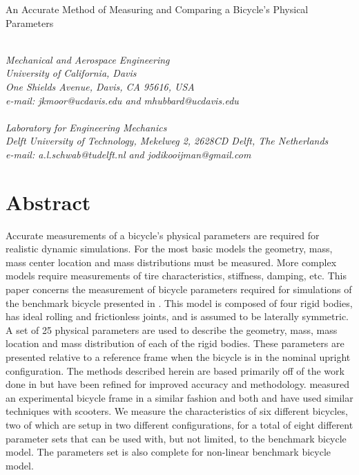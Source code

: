 \documentclass{bmd2010a}
\begin{document}
\begin{flushleft}
{\fontsize{16pt}{20pt}\selectfont%
  An Accurate Method of Measuring and Comparing a Bicycle's Physical Parameters\\}
\end{flushleft}

\begin{flushleft}
  {\\}
  \textit{Mechanical and Aerospace Engineering\\
          University of California, Davis\\
          One Shields Avenue, Davis, CA 95616, USA\\
          e-mail: jkmoor@ucdavis.edu and mhubbard@ucdavis.edu
  }\vspace{10pt}\\
  {\\}
  \textit{Laboratory for Engineering Mechanics\\
          Delft University of Technology, Mekelweg 2, 2628CD Delft, The
          Netherlands\\
          e-mail: a.l.schwab@tudelft.nl and jodikooijman@gmail.com
  }\vspace{10pt}\\
\end{flushleft}

\section*{Abstract}
Accurate measurements of a bicycle's physical parameters are required for
realistic dynamic simulations. For the most basic models the geometry, mass,
mass center location and mass distributions must be measured. More complex models
require measurements of tire characteristics, stiffness, damping, etc. This
paper concerns the measurement of bicycle parameters required for
simulations of the benchmark bicycle presented in \cite{Meijaard2007}. This
model is composed of four rigid bodies, has ideal rolling and frictionless joints,
and is assumed to be laterally symmetric. A set of 25
physical parameters are used to describe the geometry, mass, mass location and
mass distribution of each of the rigid bodies. These parameters are presented
relative to a reference frame when the bicycle is in the nominal upright
configuration. The methods described herein are based primarily off of the work
done in \cite{Kooijman2006} but have been refined for improved accuracy and
methodology. \cite{Roland1971} measured an experimental bicycle frame in a
similar fashion and both \cite{Dohring1953} and \cite{Singh1971} have used
similar techniques with scooters. We measure the characteristics of six
different bicycles, two of which are setup in two different configurations, for
a total of eight different parameter sets that can be used with, but not
limited, to the benchmark bicycle model. The parameters set is also complete
for non-linear benchmark bicycle model.
\end{document}
